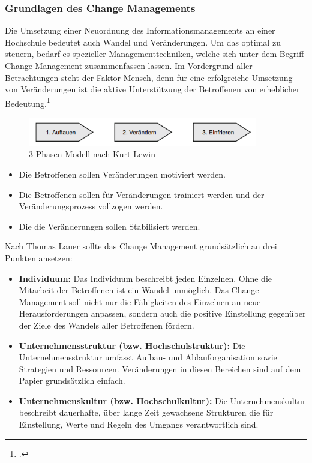 
\subsubsection{Grundlagen des Change Managements}
Die Umsetzung einer Neuordnung des Informationsmanagements an einer Hochschule bedeutet auch Wandel und Veränderungen. Um das optimal zu steuern, bedarf es spezieller Managementtechniken, welche sich unter dem Begriff Change Management zusammenfassen lassen. Im Vordergrund aller Betrachtungen steht der Faktor Mensch, denn für eine erfolgreiche Umsetzung von Veränderungen ist die aktive Unterstützung der Betroffenen von erheblicher Bedeutung.\footcite{lauer_change_2014}

\begin{figure}[h!]
	\centering
	\includegraphics[width=10cm]{kapitel/gruppe4_1/bilder/drei_phasen_modell}
	\caption{3-Phasen-Modell nach Kurt Lewin}
	\label{fig_drei_phasen_modell}
\end{figure}

\begin{itemize}
	\item Die Betroffenen sollen Veränderungen motiviert werden.
	\item Die Betroffenen sollen für Veränderungen trainiert werden und der Veränderungsprozess vollzogen werden.
	\item Die die Veränderungen sollen Stabilisiert werden.
\end{itemize}


Nach Thomas Lauer sollte das Change Management grundsätzlich an drei Punkten ansetzen:
\begin{itemize}
	\item \textbf{Individuum:} Das Individuum beschreibt jeden Einzelnen. Ohne die Mitarbeit der Betroffenen ist ein Wandel unmöglich. Das Change Management soll nicht nur die Fähigkeiten des Einzelnen an neue Herausforderungen anpassen, sondern auch die positive Einstellung gegenüber der Ziele des Wandels aller Betroffenen fördern.
	\item \textbf{Unternehmensstruktur (bzw. Hochschulstruktur):} Die Unternehmensstruktur umfasst Aufbau- und Ablauforganisation sowie Strategien und Ressourcen. Veränderungen in diesen Bereichen sind auf dem Papier grundsätzlich einfach.
	\item \textbf{Unternehmenskultur (bzw. Hochschulkultur):} Die Unternehmenskultur beschreibt dauerhafte, über lange Zeit gewachsene Strukturen die für Einstellung, Werte und Regeln des Umgangs verantwortlich sind. 
\end{itemize}

